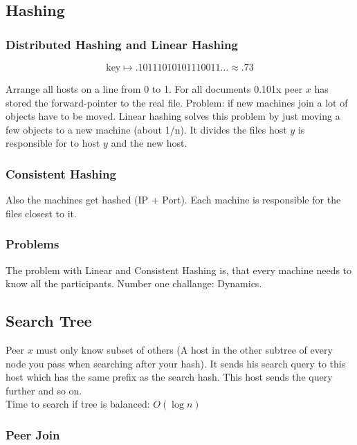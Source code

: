\documentclass[10pt, a4paper, twocolumn]{scrartcl}
\begin{document}
\subsection{Hashing}

\subsubsection{Distributed Hashing and Linear Hashing}

\begin{displaymath}
	\mbox{key} \longmapsto .10111010101110011 \ldots \approx .73
\end{displaymath}

Arrange all hosts on a line from 0 to 1. For all documents 0.101x peer $x$ has stored the forward-pointer to the real file. Problem: if new machines join a lot of objects have to be moved. Linear hashing solves this problem by just moving a few objects to a new machine (about 1/n). It divides the files host $y$ is responsible for to host $y$ and the new host.

\subsubsection{Consistent Hashing}

Also the machines get hashed (IP + Port). Each machine is responsible for the files closest to it.

\subsubsection{Problems}

The problem with Linear and Consistent Hashing is, that every machine needs to know all the participants. Number one challange: Dynamics.

\subsection{Search Tree}

Peer $x$ must only know subset of others (A host in the other subtree of every node you pass when searching after your hash). It sends his search query to this host which has the same prefix as the search hash. This host sends the query further and so on.\\

Time to search if tree is balanced: $O(\log n)$

\subsubsection{Peer Join}
\end{document}
